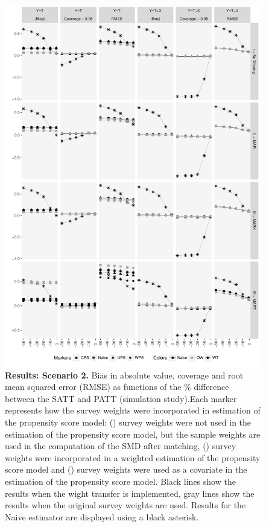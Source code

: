 \documentclass[oupdraft]{bio}
\newcommand{\mysquare}[1]{\tikz{\node[draw=#1,fill=#1,rectangle,minimum
width=0.18cm,minimum height=0.18cm,inner sep=0pt] at (0,0) {};}}
\newcommand{\mycircle}[1]{\tikz{\node[draw=#1,fill=#1,circle,minimum
width=0.2cm,minimum height=0.2cm,inner sep=0pt] at (0,0) {};}}
\newcommand{\mytriangle}[1]{\tikz{\node[draw=#1,fill=#1,isosceles
triangle,isosceles triangle stretches,shape border rotate=90,minimum
width=0.2cm,minimum height=0.2cm,inner sep=0pt] at (0,0) {};}}
\begin{document}
\begin{figure}[t]
\centering\includegraphics[scale=0.63]{Scenario2_v2.pdf}
\caption{{\small{}\textbf{Results: Scenario 2.} Bias in absolute value, coverage and root mean squared error (RMSE) as functions
of the \% difference between the SATT and PATT (simulation study).Each marker represents how the survey weights were incorporated in estimation of the propensity score model: (\mytriangle{black}) survey weights were not used in the estimation of the propensity score model, but the sample weights are used in the computation of the SMD after matching, (\mycircle{black}) survey weights were incorporated in a weighted estimation of the propensity score model and (\mysquare{black})  survey weights were used as a covariate in the estimation of the propensity score model. Black lines  show the results when the wight transfer is implemented, gray lines show the results when the original survey weights are used. Results for the Naive estimator are displayed using a black asterisk.}}
\label{Scenario2} 
\end{figure}
\end{document}
